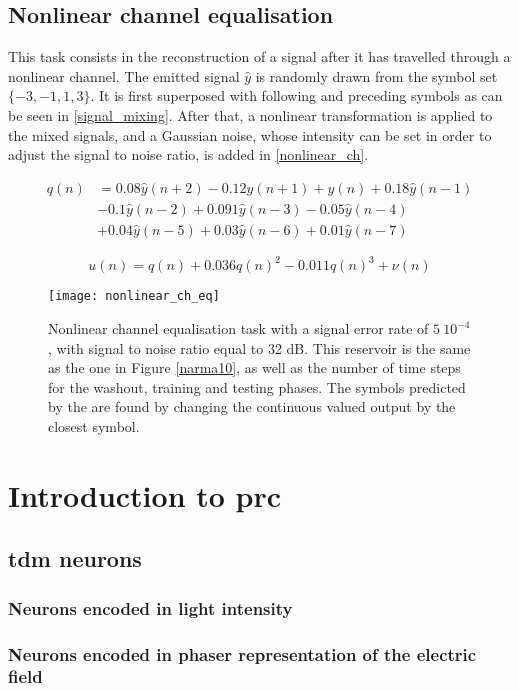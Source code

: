 \subsection{Nonlinear channel equalisation}

This task consists in the reconstruction of a signal after it has travelled through a nonlinear channel. The emitted signal $\hat{y}$ is randomly drawn from the symbol set $\{-3,-1,1,3\}$. It is first superposed with following and preceding symbols as can be seen in \eqref{signal_mixing}. After that, a nonlinear transformation is applied to the mixed signals, and a Gaussian noise, whose intensity can be set in order to adjust the signal to noise ratio, is added in \eqref{nonlinear_ch}. 

\begin{align}
	q(n) &= 0.08\hat{y}(n+2)-0.12\hat{y}(n+1)+\hat{y}(n)+0.18\hat{y}(n-1) \nonumber\\
	&-0.1\hat{y}(n-2)+0.091\hat{y}(n-3)-0.05\hat{y}(n-4) \nonumber\\
	&+0.04\hat{y}(n-5)+0.03\hat{y}(n-6)+0.01\hat{y}(n-7) \label{signal_mixing}
\end{align}

\begin{equation}
	u(n)=q(n)+0.036q(n)^2-0.011q(n)^3+\nu(n)
	\label{nonlinear_ch}
\end{equation}

\begin{figure}[h]
	\centering
	\texttt{[image: nonlinear\_ch\_eq]}
	\caption{Nonlinear channel equalisation task with a signal error rate of $5~10^{-4}$, with signal to noise ratio equal to 32 dB. This reservoir is the same as the one in Figure \ref{narma10}, as well as the number of time steps for the washout, training and testing phases. The symbols predicted by the \rcer are found by changing the continuous valued output by the closest symbol.}
\end{figure}


\section{Introduction to \acrlong{prc}}

\label{prc}

\subsection{\acrlong{tdm} neurons}

\subsubsection{Neurons encoded in light intensity}

\subsubsection{Neurons encoded in phaser representation of the electric field}
